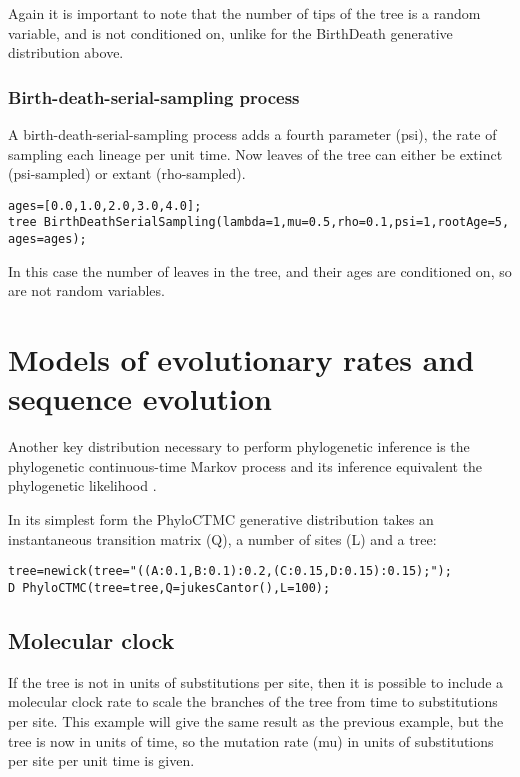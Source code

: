 \documentclass[10pt,letterpaper,table]{article}
\begin{document}
Again it is important to note that the number of tips of the tree is a random variable, and is not conditioned on,
unlike for the BirthDeath generative distribution above.

\subsubsection*{Birth-death-serial-sampling process}

A birth-death-serial-sampling \cite{stadler2013dating} process adds a fourth parameter (psi), the rate of sampling each lineage per unit time.
Now leaves of the tree can either be extinct (psi-sampled) or extant (rho-sampled).

\begin{alltt}
  ages = [0.0,1.0,2.0,3.0,4.0];
  tree ~ BirthDeathSerialSampling(lambda=1, mu=0.5, rho=0.1, psi=1, rootAge=5, ages=ages);
\end{alltt}

In this case the number of leaves in the tree, and their ages are conditioned on, so are not random variables.



\section*{Models of evolutionary rates and sequence evolution}

Another key distribution necessary to perform phylogenetic inference
is the phylogenetic continuous-time Markov process and its inference
equivalent the phylogenetic likelihood \cite{felsenstein1981}.

In its simplest form the PhyloCTMC generative
distribution takes an instantaneous transition matrix (Q), a number of sites (L) and a tree:

\begin{alltt}
  tree = newick(tree="((A:0.1,B:0.1):0.2,(C:0.15,D:0.15):0.15);");
  D ~ PhyloCTMC(tree=tree, Q=jukesCantor(), L=100);
\end{alltt}

\subsection*{Molecular clock}

If the tree is not in units of substitutions per site, then it is possible to include a molecular clock rate
to scale the branches of the tree from time to substitutions per site. This example will give the same
result as the previous example, but the tree is now in units of time, so the mutation rate (mu) in units of
substitutions per site per unit time is given.
\end{document}
